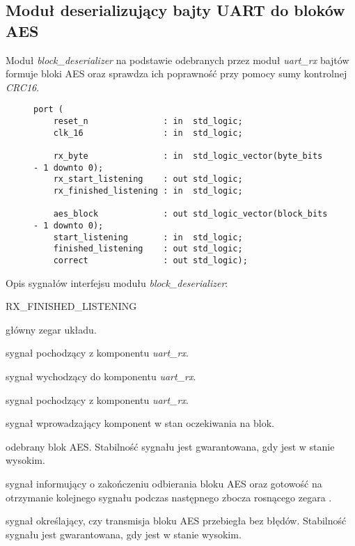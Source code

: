 \subsection{Moduł deserializujący bajty UART do bloków AES}
\label{sec:block-deserializer}
Moduł \textit{block\_deserializer} na podstawie odebranych przez moduł \textit{uart\_rx} bajtów formuje bloki AES oraz sprawdza ich poprawność przy pomocy sumy kontrolnej \textit{CRC16}.

\begin{figure}[!h]
\begin{lstlisting}[style=vhdl, captionpos=b, caption={\textit{block\_deserializer} -- interfejs modułu}]
port (
	reset_n               : in  std_logic;
	clk_16                : in  std_logic;

	rx_byte               : in  std_logic_vector(byte_bits - 1 downto 0);
	rx_start_listening    : out std_logic;
	rx_finished_listening : in  std_logic;

	aes_block             : out std_logic_vector(block_bits - 1 downto 0);
	start_listening       : in  std_logic;
	finished_listening    : out std_logic;
	correct               : out std_logic);
\end{lstlisting}
\end{figure}

Opis sygnałów interfejsu modułu \textit{block\_deserializer}:
\begin{interface}{RX\_FINISHED\_LISTENING}
	\item[\insignal{CLK\_16}] główny zegar układu.

	\item[\insignal{RX\_BYTE[7:0]}] sygnał pochodzący z komponentu \textit{uart\_rx}.
	\item[\outsignal{RX\_START\_LISTENING}] sygnał wychodzący do komponentu \textit{uart\_rx}.
	\item[\insignal{RX\_FINISHED\_LISTENING}] sygnał pochodzący z komponentu \textit{uart\_rx}.

	\item[\insignal{START\_LISTENING}] sygnał wprowadzający komponent w stan oczekiwania na blok.
	\item[\outsignal{AES\_BLOCK[127:0]}] odebrany blok AES. Stabilność sygnału jest gwarantowana, gdy  jest w stanie wysokim.
	\item[\outsignal{FINISHED\_LISTENING}] sygnał informujący o zakończeniu odbierania bloku AES oraz gotowość na otrzymanie kolejnego sygnału  podczas następnego zbocza rosnącego zegara .
	\item[\outsignal{CORRECT}] sygnał określający, czy transmisja bloku AES przebiegła bez błędów. Stabilność sygnału jest gwarantowana, gdy  jest w stanie wysokim.
\end{interface}


